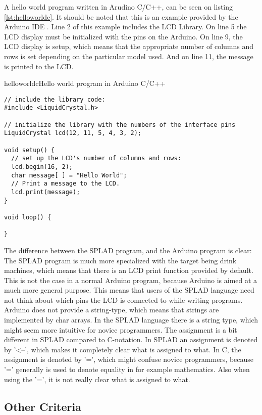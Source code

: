 A hello world program written in Arudino C/C++, can be seen on listing \ref{lst:helloworldc}. It should be noted that this is an example provided by the Arduino IDE \citep{LCDtut}. Line 2 of this example includes the LCD Library. On line 5 the LCD display must be initialized with the pins on the Arduino. On line 9, the LCD display is setup, which means that the appropriate number of columns and rows is set depending on the particular model used. And on line 11, the message is printed to the LCD.
 
\begin{code}{helloworldc}{Hello world program in Arduino C/C++}
\begin{lstlisting}
// include the library code:
#include <LiquidCrystal.h>

// initialize the library with the numbers of the interface pins
LiquidCrystal lcd(12, 11, 5, 4, 3, 2);

void setup() {
  // set up the LCD's number of columns and rows: 
  lcd.begin(16, 2);
  char message[ ] = "Hello World";
  // Print a message to the LCD.
  lcd.print(message);
}

void loop() {

}
\end{lstlisting}
\end{code}
The difference between the SPLAD program, and the Arduino program is clear: The SPLAD program is much more specialized with the target being drink machines, which means that there is an LCD print function provided by default. This is not the case in a normal Arduino program, because Arduino is aimed at a much more general purpose. This means that users of the SPLAD language need not think about which pins the LCD is connected to while writing programs. Arduino does not provide a string-type, which means that strings are implemented by char arrays. In the SPLAD language there is a string type, which might seem more intuitive for novice programmers. The assignment is a bit different in SPLAD compared to C-notation. In SPLAD an assignment is denoted by '<--', which makes it completely clear what is assigned to what. In C, the assignment is denoted by '=', which might confuse novice programmers, because '=' generally is used to denote equality in for example mathematics. Also when using the '=', it is not really clear what is assigned to what.

\subsection{Other Criteria}

